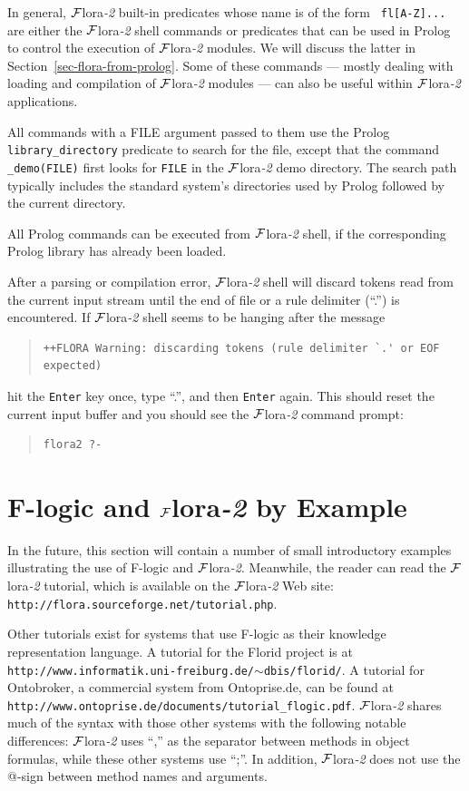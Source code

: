 \documentclass[11pt]{article}
\newcommand{\FLORA}{{\mbox{\sc ${\cal F}${lora}\rm\emph{-2}}}\xspace}
\newcommand{\FLORID}{{\mbox{\sc Florid}}\xspace}
\newcommand{\fl}{\mbox{F-logic}\xspace}
\begin{document}
In general, \FLORA built-in predicates whose name is of the form {\tt
  fl[A-Z]...} are either the \FLORA shell commands or predicates that can
be used in Prolog to control the execution of \FLORA modules. We will
discuss the latter in Section~\ref{sec-flora-from-prolog}. Some of these
commands --- mostly dealing with loading and compilation of \FLORA modules
  --- can also be useful within \FLORA applications.

All commands with a FILE argument passed to them use the Prolog
{\tt library\_directory} predicate to search for the file, except that the
command {\tt \_demo(FILE)} first looks for {\tt FILE} in the \FLORA demo
directory. The search path typically includes the standard system's
directories used by Prolog followed by the current directory. 

All Prolog commands can be executed from \FLORA shell, if the corresponding
Prolog library has already been loaded.

After a parsing or compilation error, \FLORA shell will
discard tokens read from the current input stream until the end of file or a
rule delimiter (``.'') is encountered. If \FLORA shell seems to be hanging
after the message
\begin{quote}
\begin{verbatim}
++FLORA Warning: discarding tokens (rule delimiter `.' or EOF expected)
\end{verbatim}
\end{quote}
hit the {\tt Enter} key once, type ``.'', and then {\tt Enter} again.  This
should reset the current input buffer and you should see the \FLORA command
prompt:
\begin{quote}
\begin{verbatim}
flora2 ?-
\end{verbatim}
\end{quote}

 
\section{\fl and \FLORA by Example}


In the future, this section will contain a number of small
introductory examples illustrating the use of \fl and \FLORA. Meanwhile, the
reader can read the \FLORA tutorial, which is
available on the \FLORA Web site: {\tt
  http://flora.sourceforge.net/tutorial.php}. 

Other tutorials exist for systems that use F-logic as their knowledge
representation language. A tutorial for the \FLORID project is at
{\tt http://www.informatik.uni-freiburg.de/$\sim$dbis/florid/}. A tutorial
for Ontobroker, a commercial system from Ontoprise.de, can be found at\\
{\tt http://www.ontoprise.de/documents/tutorial\_flogic.pdf}.  \FLORA shares
much of the syntax with those other systems with the following notable
differences: \FLORA uses ``,'' as the separator between methods in object
formulas, while these other systems use ``;''. In addition, \FLORA does not
use the @-sign between method names and arguments.
\end{document}
